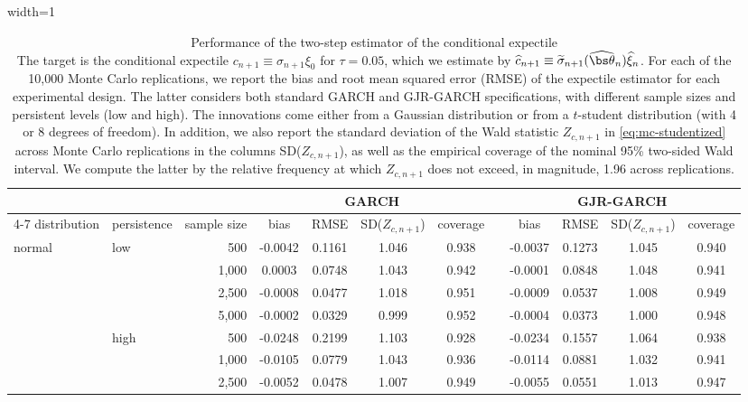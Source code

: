 \begin{table}[t]
\caption{Performance of the two-step estimator of the conditional expectile\\ {\footnotesize The target is the conditional expectile $c_{n+1}\equiv\sigma_{n+1}\xi_0$ for $\tau=0.05$, which we estimate by $\widehat{c}_{n+1}\equiv\widetilde\sigma_{n+1}(\widehat{\bs\theta}_n)\widehat{\xi}_n$. For each of the 10,000 Monte Carlo replications, we report the bias and root mean squared error (RMSE) of the expectile estimator for each experimental design. The latter considers both standard GARCH and GJR-GARCH specifications, with different sample sizes and persistent levels (low and high). The innovations come either from a Gaussian distribution or from a $t$-student distribution (with 4 or 8 degrees of freedom). In addition, we also report the standard deviation of the Wald statistic $Z_{c,n+1}$ in \eqref{eq:mc-studentized} across Monte Carlo replications in the columns SD($Z_{c,n+1}$), as well as the empirical coverage of the nominal 95\% two-sided Wald interval. We compute the latter by the relative frequency at which $Z_{c,n+1}$ does not exceed, in magnitude, 1.96 across replications.}}
\label{tab:mc-ce-wald-portrait}
\begin{adjustbox}{width=1\textwidth}
\renewcommand{\arraystretch}{1.25}
\begin{tabular}{llr*{9}{c}}
\toprule
&&&\multicolumn{4}{c}{GARCH}&&\multicolumn{4}{c}{GJR-GARCH}\\
\cline{4-7}\cline{9-12}
distribution & persistence & sample size & bias & RMSE & SD($Z_{c,n+1}$) & coverage && bias & RMSE & SD($Z_{c,n+1}$) & coverage\\
\midrule
normal & low & 500 & -0.0042 & 0.1161 & 1.046 & 0.938 && -0.0037 & 0.1273 & 1.045 & 0.940\\
 &  & 1,000 & 0.0003 & 0.0748 & 1.043 & 0.942 && -0.0001 & 0.0848 & 1.048 & 0.941\\
 &  & 2,500 & -0.0008 & 0.0477 & 1.018 & 0.951 && -0.0009 & 0.0537 & 1.008 & 0.949\\
 &  & 5,000 & -0.0002 & 0.0329 & 0.999 & 0.952 && -0.0004 & 0.0373 & 1.000 & 0.948\\
\addlinespace[1pt]
 & high & 500 & -0.0248 & 0.2199 & 1.103 & 0.928 && -0.0234 & 0.1557 & 1.064 & 0.938\\
 &  & 1,000 & -0.0105 & 0.0779 & 1.043 & 0.936 && -0.0114 & 0.0881 & 1.032 & 0.941\\
 &  & 2,500 & -0.0052 & 0.0478 & 1.007 & 0.949 && -0.0055 & 0.0551 & 1.013 & 0.947\\

\end{tabular}
\end{adjustbox}
\end{table}
